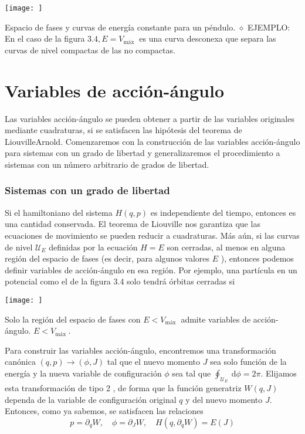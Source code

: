 \begin{marginfigure}[]
  \texttt{[image: ]}
  \caption[]{Espacio de fases y curvas de energía constante para un péndulo.
  $\diamond$ EJEMPLO: En el caso de la figura $3.4, E=V_{\text {máx }}$ es una curva desconexa que separa las curvas de nivel compactas de las no compactas.}
\end{marginfigure}

\section{Variables de acción-ángulo}
Las variables acción-ángulo se pueden obtener a partir de las variables originales mediante cuadraturas, si se satisfacen las hipótesis del teorema de LiouvilleArnold. Comenzaremos con la construcción de las variables acción-ángulo para sistemas con un grado de libertad y generalizaremos el procedimiento a sistemas con un número arbitrario de grados de libertad.
\subsubsection{Sistemas con un grado de libertad}
Si el hamiltoniano del sistema $H(q, p)$ es independiente del tiempo, entonces es una cantidad conservada. El teorema de Liouville nos garantiza que las ecuaciones de movimiento se pueden reducir a cuadraturas. Más aún, si las curvas de nivel $\mathscr{U}_{E}$ definidas por la ecuación $H=E$ son cerradas, al menos en alguna región del espacio de fases (es decir, para algunos valores $E$ ), entonces podemos definir variables de acción-ángulo en esa región. Por ejemplo, una partícula en un potencial como el de la figura 3.4 solo tendrá órbitas cerradas si
\begin{marginfigure}[]
  \texttt{[image: ]}
  \caption[]{Solo la región del espacio de fases con $E<V_{\text {máx }}$ admite variables de acción-ángulo.
  $E<V_{\text {máx }}$.}
\end{marginfigure}
Para construir las variables acción-ángulo, encontremos una transformación canónica $(q, p) \rightarrow(\phi, J)$ tal que el nuevo momento $J$ sea solo función de la energía y la nueva variable de configuración $\phi$ sea tal que $\oint_{\mathscr{U}_{E}} \mathrm{~d} \phi=2 \pi$. Elijamos esta transformación de tipo 2 , de forma que la función generatriz $W(q, J)$ dependa de la variable de configuración original $q$ y del nuevo momento $J$. Entonces, como ya sabemos, se satisfacen las relaciones
$$
p=\partial_{q} W, \quad \phi=\partial_{J} W, \quad H\left(q, \partial_{q} W\right)=E(J)
$$

